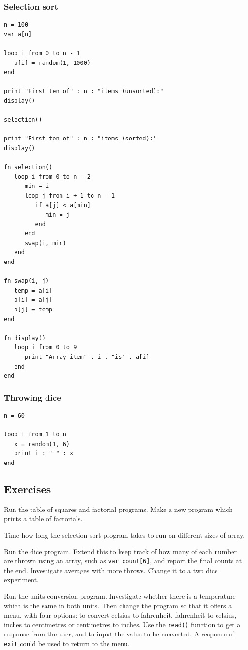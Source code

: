 \documentclass[12pt,a4paper,twoside]{article}
\renewcommand{\_}{\texttt{\symbol{95}}}
\begin{document}
\subsubsection*{Selection sort}

\begin{verbatim}
n = 100
var a[n]

loop i from 0 to n - 1
   a[i] = random(1, 1000)
end

print "First ten of" : n : "items (unsorted):"
display()

selection()

print "First ten of" : n : "items (sorted):"
display()

fn selection()
   loop i from 0 to n - 2
      min = i
      loop j from i + 1 to n - 1
         if a[j] < a[min]
            min = j
         end
      end
      swap(i, min)
   end
end

fn swap(i, j)
   temp = a[i]
   a[i] = a[j]
   a[j] = temp
end

fn display()
   loop i from 0 to 9
      print "Array item" : i : "is" : a[i]
   end
end
\end{verbatim}

\subsubsection*{Throwing dice}

\begin{verbatim}
n = 60

loop i from 1 to n
   x = random(1, 6)
   print i : " " : x
end
\end{verbatim}

\subsection{Exercises}

\begin{numericlist}
\item Run the table of squares and factorial programs.
	Make a new program which prints a table of factorials.
\item Time how long the selection sort program takes to run on
	different sizes of array.
\item Run the dice program.
	Extend this to keep track of how many of each number are thrown
	using an array, such as \texttt{var count[6]}, and report the
	final counts at the end.
	Investigate averages with more throws.
	Change it to a two dice experiment.
\item Run the units conversion program.
	Investigate whether there is a temperature which is the same in
	both units.
	Then change the program so that it offers a menu, with four options:
	to convert celsius to fahrenheit, fahrenheit to celsius, inches to
	centimetres or centimetres to inches. Use the \texttt{read()}
	function to get a response from the user, and to input the value
	to be converted. A response of \texttt{exit} could be used to return
	to the menu.
\end{numericlist}
\end{document}
